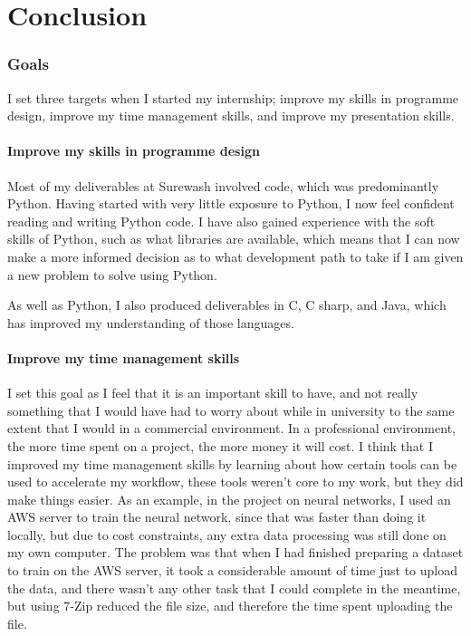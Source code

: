 \part{Conclusion}
\section{Goals}
I set three targets when I started my internship; improve my skills in programme design, improve my time management skills, and improve my presentation skills.
    \subsection{Improve my skills in programme design} Most of my deliverables at Surewash involved code, which was predominantly Python. Having started with very little exposure to Python, I now feel confident reading and writing Python code. I have also gained experience with the soft skills of Python, such as what libraries are available, which means that I can now make a more informed decision as to what development path to take if I am given a new problem to solve using Python.

    As well as Python, I also produced deliverables in C, C sharp, and Java, which has improved my understanding of those languages.

    \subsection{Improve my time management skills} I set this goal as I feel that it is an important skill to have, and not really something that I would have had to worry about while in university to the same extent that I would in a commercial environment. In a professional environment, the more time spent on a project, the more money it will cost. I think that I improved my time management skills by learning about how certain tools can be used to accelerate my workflow, these tools weren't core to my work, but they did make things easier. As an example, in the project on neural networks, I used an AWS server to train the neural network, since that was faster than doing it locally, but due to cost constraints, any extra data processing was still done on my own computer. The problem was that when I had finished preparing a dataset to train on the AWS server, it took a considerable amount of time just to upload the data, and there wasn't any other task that I could complete in the meantime, but using 7-Zip reduced the file size, and therefore the time spent uploading the file.

